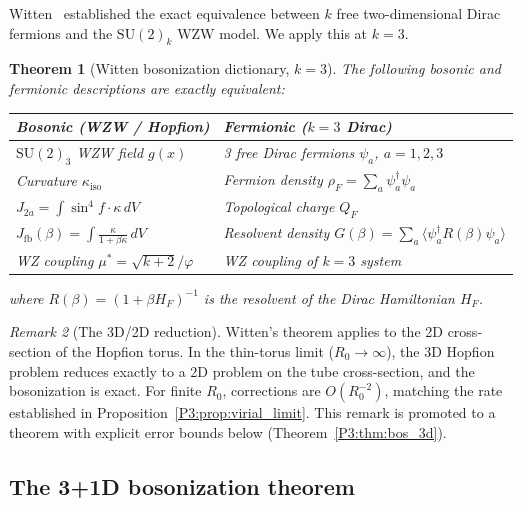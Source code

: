 \documentclass[11pt,a4paper]{article}
\newtheorem{theorem}{Theorem}[section]
\theoremstyle{definition}
\theoremstyle{remark}
\newtheorem{remark}[theorem]{Remark}
\newcommand{\vp}{\varphi}
\begin{document}
Witten~\cite{Witten1984} established the exact equivalence between $k$ free
two-dimensional Dirac fermions and the $\mathrm{SU}(2)_k$ WZW model.
We apply this at $k=3$.

\begin{theorem}[Witten bosonization dictionary, $k=3$]
\label{P3:thm:bosonization}
The following bosonic and fermionic descriptions are exactly equivalent:
\begin{center}
\renewcommand{\arraystretch}{1.4}
\begin{tabular}{ll}
\toprule
Bosonic (WZW / Hopfion) & Fermionic ($k=3$ Dirac) \\
\midrule
$\mathrm{SU}(2)_3$ WZW field $g(x)$ & 3 free Dirac fermions $\psi_a$, $a=1,2,3$ \\
Curvature $\kappa_{\mathrm{iso}}$ & Fermion density $\rho_F = \sum_a \psi_a^\dagger\psi_a$ \\
$J_{2a} = \int\!\sin^4\!f\cdot\kappa\,dV$ & Topological charge $Q_F$ \\
$J_{\mathrm{fb}}(\beta) = \int\!\frac{\kappa}{1+\beta\kappa}\,dV$ & Resolvent density $G(\beta) = \sum_a\langle\psi_a^\dagger R(\beta)\psi_a\rangle$ \\
WZ coupling $\mu^* = \sqrt{k+2}/\vp$ & WZ coupling of $k=3$ system \\
\bottomrule
\end{tabular}
\end{center}
where $R(\beta) = (1 + \beta H_F)^{-1}$ is the resolvent of the Dirac Hamiltonian $H_F$.
\end{theorem}

\begin{remark}[The 3D/2D reduction]
\label{P3:rem:3d2d_reduction}
Witten's theorem applies to the 2D cross-section of the Hopfion torus.
In the thin-torus limit ($R_0\to\infty$), the 3D Hopfion problem reduces
exactly to a 2D problem on the tube cross-section, and the bosonization
is exact.  For finite $R_0$, corrections are $O(R_0^{-2})$, matching
the rate established in Proposition~\ref{P3:prop:virial_limit}.
This remark is promoted to a theorem with explicit error bounds below
(Theorem~\ref{P3:thm:bos_3d}).
\end{remark}

\subsection{The 3+1D bosonization theorem}
\label{P3:sec:bos3d}
\end{document}

